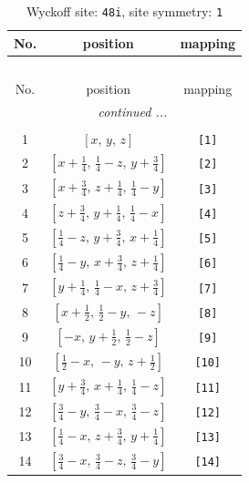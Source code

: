 \documentclass[fleqn,8pt]{jsarticle}
\begin{document}
\begin{longtable}{ccc}
\caption{Wyckoff site: {\tt 48i}, site symmetry: {\tt 1}}
 \\
 \hline \hline
No. & position & mapping \\ \hline \endfirsthead

\multicolumn{2}{l}{\tablename\ \thetable{}} \\
 \hline \hline
No. & position & mapping \\ \hline \endhead

 \hline \hline
\multicolumn{2}{r}{\footnotesize\it continued ...} \\ \endfoot

 \hline \hline
\multicolumn{2}{r}{} \\ \endlastfoot

1 & $\left[ x,\, y,\, z \right]$ & {\tt [1]} \\ \hline
2 & $\left[ x + \frac{1}{4},\, \frac{1}{4} - z,\, y + \frac{3}{4} \right]$ & {\tt [2]} \\ \hline
3 & $\left[ x + \frac{3}{4},\, z + \frac{1}{4},\, \frac{1}{4} - y \right]$ & {\tt [3]} \\ \hline
4 & $\left[ z + \frac{3}{4},\, y + \frac{1}{4},\, \frac{1}{4} - x \right]$ & {\tt [4]} \\ \hline
5 & $\left[ \frac{1}{4} - z,\, y + \frac{3}{4},\, x + \frac{1}{4} \right]$ & {\tt [5]} \\ \hline
6 & $\left[ \frac{1}{4} - y,\, x + \frac{3}{4},\, z + \frac{1}{4} \right]$ & {\tt [6]} \\ \hline
7 & $\left[ y + \frac{1}{4},\, \frac{1}{4} - x,\, z + \frac{3}{4} \right]$ & {\tt [7]} \\ \hline
8 & $\left[ x + \frac{1}{2},\, \frac{1}{2} - y,\, - z \right]$ & {\tt [8]} \\ \hline
9 & $\left[ - x,\, y + \frac{1}{2},\, \frac{1}{2} - z \right]$ & {\tt [9]} \\ \hline
10 & $\left[ \frac{1}{2} - x,\, - y,\, z + \frac{1}{2} \right]$ & {\tt [10]} \\ \hline
11 & $\left[ y + \frac{3}{4},\, x + \frac{1}{4},\, \frac{1}{4} - z \right]$ & {\tt [11]} \\ \hline
12 & $\left[ \frac{3}{4} - y,\, \frac{3}{4} - x,\, \frac{3}{4} - z \right]$ & {\tt [12]} \\ \hline
13 & $\left[ \frac{1}{4} - x,\, z + \frac{3}{4},\, y + \frac{1}{4} \right]$ & {\tt [13]} \\ \hline
14 & $\left[ \frac{3}{4} - x,\, \frac{3}{4} - z,\, \frac{3}{4} - y \right]$ & {\tt [14]} \\ \hline

\end{longtable}
\end{document}
